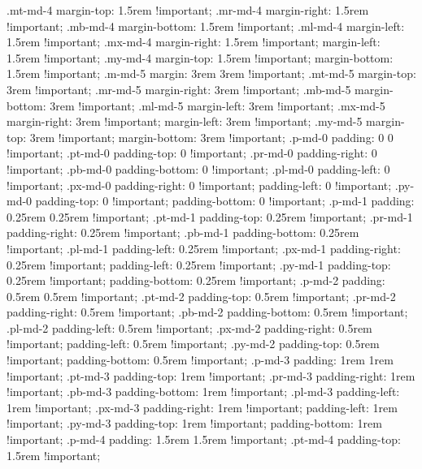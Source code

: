 {{{{{{{{{{{{{{{{{{{{{{{{{{{{{{{{{{{{{{{{{{{{{{{{{{{{{{{{{{{{{{{{{{{{{{{{{{{{{{{{{{{{{{{{{{{{{{{{{{{{{{{{{{{{{{{{{{{{{{{{{{{{{{{{{{{{{{{{{{{{{{{{{{{{{{{{{{{{{{{{{{{{{{{{{{{{{{{{{{{{{{{{{{{{{{{{{{{{{{{{{{{{{{{{{{{{{{{{{{{{{{{{{{{{{{{{{{{{{{{{{{{{{{{{{{{{{{{{{{{{{{{{{{{{{{{{{{{{{{{{{{{{{{{{{{{{{{{{{{{{{{{{{{{  .mt-md-4 {
    margin-top: 1.5rem !important; }
  .mr-md-4 {
    margin-right: 1.5rem !important; }
  .mb-md-4 {
    margin-bottom: 1.5rem !important; }
  .ml-md-4 {
    margin-left: 1.5rem !important; }
  .mx-md-4 {
    margin-right: 1.5rem !important;
    margin-left: 1.5rem !important; }
  .my-md-4 {
    margin-top: 1.5rem !important;
    margin-bottom: 1.5rem !important; }
  .m-md-5 {
    margin: 3rem 3rem !important; }
  .mt-md-5 {
    margin-top: 3rem !important; }
  .mr-md-5 {
    margin-right: 3rem !important; }
  .mb-md-5 {
    margin-bottom: 3rem !important; }
  .ml-md-5 {
    margin-left: 3rem !important; }
  .mx-md-5 {
    margin-right: 3rem !important;
    margin-left: 3rem !important; }
  .my-md-5 {
    margin-top: 3rem !important;
    margin-bottom: 3rem !important; }
  .p-md-0 {
    padding: 0 0 !important; }
  .pt-md-0 {
    padding-top: 0 !important; }
  .pr-md-0 {
    padding-right: 0 !important; }
  .pb-md-0 {
    padding-bottom: 0 !important; }
  .pl-md-0 {
    padding-left: 0 !important; }
  .px-md-0 {
    padding-right: 0 !important;
    padding-left: 0 !important; }
  .py-md-0 {
    padding-top: 0 !important;
    padding-bottom: 0 !important; }
  .p-md-1 {
    padding: 0.25rem 0.25rem !important; }
  .pt-md-1 {
    padding-top: 0.25rem !important; }
  .pr-md-1 {
    padding-right: 0.25rem !important; }
  .pb-md-1 {
    padding-bottom: 0.25rem !important; }
  .pl-md-1 {
    padding-left: 0.25rem !important; }
  .px-md-1 {
    padding-right: 0.25rem !important;
    padding-left: 0.25rem !important; }
  .py-md-1 {
    padding-top: 0.25rem !important;
    padding-bottom: 0.25rem !important; }
  .p-md-2 {
    padding: 0.5rem 0.5rem !important; }
  .pt-md-2 {
    padding-top: 0.5rem !important; }
  .pr-md-2 {
    padding-right: 0.5rem !important; }
  .pb-md-2 {
    padding-bottom: 0.5rem !important; }
  .pl-md-2 {
    padding-left: 0.5rem !important; }
  .px-md-2 {
    padding-right: 0.5rem !important;
    padding-left: 0.5rem !important; }
  .py-md-2 {
    padding-top: 0.5rem !important;
    padding-bottom: 0.5rem !important; }
  .p-md-3 {
    padding: 1rem 1rem !important; }
  .pt-md-3 {
    padding-top: 1rem !important; }
  .pr-md-3 {
    padding-right: 1rem !important; }
  .pb-md-3 {
    padding-bottom: 1rem !important; }
  .pl-md-3 {
    padding-left: 1rem !important; }
  .px-md-3 {
    padding-right: 1rem !important;
    padding-left: 1rem !important; }
  .py-md-3 {
    padding-top: 1rem !important;
    padding-bottom: 1rem !important; }
  .p-md-4 {
    padding: 1.5rem 1.5rem !important; }
  .pt-md-4 {
    padding-top: 1.5rem !important; }
}}}}}}}}}}}}}}}}}}}}}}}}}}}}}}}}}}}}}}}}}}}}}}}}}}}}}}}}}}}}}}}}}}}}}}}}}}}}}}}}}}}}}}}}}}}}}}}}}}}}}}}}}}}}}}}}}}}}}}}}}}}}}}}}}}}}}}}}}}}}}}}}}}}}}}}}}}}}}}}}}}}}}}}}}}}}}}}}}}}}}}}}}}}}}}}}}}}}}}}}}}}}}}}}}}}}}}}}}}}}}}}}}}}}}}}}}}}}}}}}}}}}}}}}}}}}}}}}}}}}}}}}}}}}}}}}}}}}}}}}}}}}}}}}}}}}}}}}}}}}}}}}}}}
